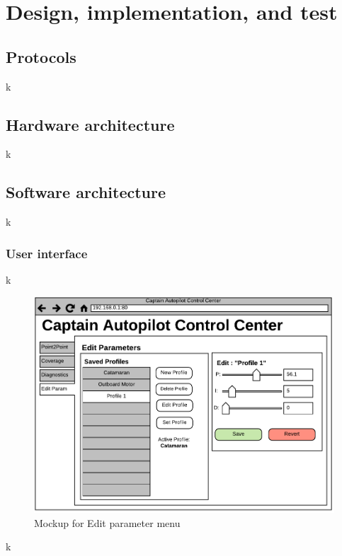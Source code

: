 \chapter{Design, implementation, and test}

\section{Protocols}
k

\section{Hardware architecture}
k

\section{Software architecture}
k

\subsection{User interface}
k

\begin{figure}[H]
	\centering
	\includegraphics[width=1\linewidth]{Images/Design/UI_Mockup_Edit_param.pdf}
	\caption{Mockup for Edit parameter menu}
\end{figure}

k

